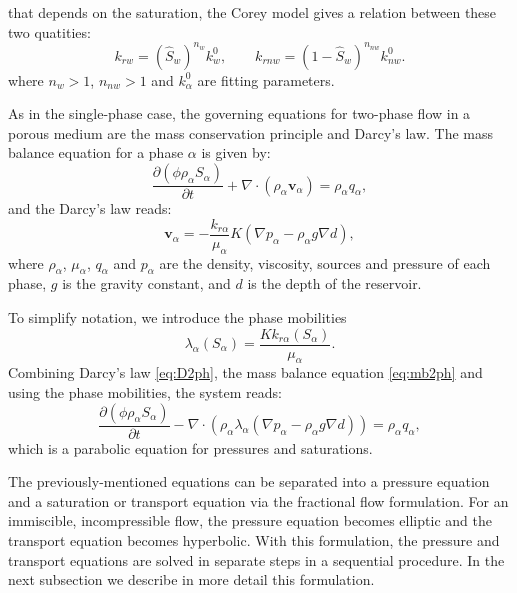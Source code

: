 \documentclass[times,final]{elsarticle}
\begin{document}
that depends on the saturation, the Corey model gives a relation between these two quatities:
\begin{equation}\label{eq:Corey}
k_{rw}=(\hat{S}_w)^{n_w}k_w^0, \qquad
k_{rnw}=(1-\hat{S}_w)^{n_{nw}}k_{nw}^0.
\end{equation}
where $n_w>1$, $n_{nw}>1$ and $k_{\alpha}^0$ are fitting parameters.\par
As in the single-phase case, the governing equations for two-phase flow in a porous medium are the mass conservation principle and Darcy's law. 
The mass balance equation for a phase $\alpha$ is given by:
\begin{equation}\label{eq:mb2ph}
 \frac{\partial(\phi \rho_{\alpha}S_{\alpha})}{\partial t}+\nabla \cdot ( \rho_{\alpha} \mathbf{v}_{\alpha})=\rho_{\alpha} q_{\alpha},
\end{equation}
and the Darcy's law reads:
\begin{equation}\label{eq:D2ph}
\mathbf{v}_{\alpha}=-\frac{k_{r\alpha}}{\mu_{\alpha}} {K}(\nabla p_{\alpha}-\rho_{\alpha} g \nabla d),
\end{equation}
where $\rho_{\alpha}$, $\mu_{\alpha}$, $q_{\alpha}$ and $p_{\alpha}$ are the density, viscosity, sources and pressure of each phase, $g$ is the gravity constant, and $d$ is the depth of the reservoir.   \par
To simplify notation, we introduce the phase mobilities 
\begin{equation}\label{eq:phm}
 \lambda_{\alpha}(S_{\alpha})=\frac{Kk_{r\alpha}(S_{\alpha})}{\mu_{\alpha}}.
\end{equation}
Combining Darcy's law \eqref{eq:D2ph}, the mass balance equation \eqref{eq:mb2ph} and using the phase mobilities, the system reads:
\begin{equation}\label{eq:2ph}
 \frac{\partial(\phi \rho_{\alpha}S_{\alpha})}{\partial t}-\nabla \cdot ( \rho_{\alpha} \lambda_{\alpha}(\nabla p_{\alpha}-\rho_{\alpha} g \nabla d))=\rho_{\alpha} q_{\alpha},
\end{equation}
which is a parabolic equation for pressures and saturations. \par 
The previously-mentioned equations can be separated into a pressure equation and a saturation or transport equation via the fractional flow formulation. For an immiscible, incompressible flow, the pressure equation becomes elliptic and the transport equation becomes hyperbolic. With this formulation, the pressure and transport equations are solved in separate steps in a sequential procedure.
In the next subsection we describe in more detail this formulation.
\end{document}
